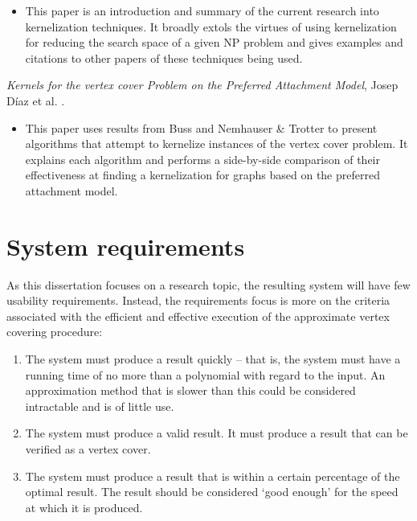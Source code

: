 \documentclass[11pt]{article}
\theoremstyle{definition}
\begin{document}
\begin{basedescript}{\desclabelstyle{\nextlinelabel}}
        \begin{itemize} 
          \renewcommand{\labelitemi}{--}
          \setlength{\itemsep}{1pt}
          \setlength{\parskip}{0pt}
          \setlength{\parsep}{0pt}
          \item This paper is an introduction and summary of the current research into kernelization techniques. It broadly extols the virtues of using kernelization for reducing the search space of a given NP problem and gives examples and citations to other papers of these techniques being used.    
        \end{itemize} 
        \item \textit{Kernels for the vertex cover Problem on the Preferred Attachment Model},  Josep Díaz et al. \cite{paper:KernelVertex}.
        \begin{itemize} 
          \renewcommand{\labelitemi}{--}
          \setlength{\itemsep}{1pt}
          \setlength{\parskip}{0pt}
          \setlength{\parsep}{0pt}
          \item This paper uses results from Buss \cite{buss:560} and Nemhauser \& Trotter \cite{springerlink:NT} to present algorithms that attempt to kernelize instances of the vertex cover problem. It explains each algorithm and performs a side-by-side comparison of their effectiveness at finding a kernelization for graphs based on the preferred attachment model.  
        \end{itemize}
      \end{basedescript}

      

  \section{System requirements}
    As this dissertation focuses on a research topic, the resulting system will have few usability requirements.
    Instead, the requirements focus is more on the criteria associated with the efficient and effective execution
    of the approximate vertex covering procedure:

    \begin{enumerate}
      \setlength{\itemsep}{1pt}
      \setlength{\parskip}{0pt}
      \setlength{\parsep}{0pt}
      \item The system must produce a result quickly -- that is, the system must have a running time of no more than a polynomial with regard to the input. An approximation method that is slower than this could be considered intractable and is of little use.  
      \item The system must produce a valid result. It must produce a result that can be verified as a vertex cover.
      \item The system must produce a result that is within a certain percentage of the optimal result. The result should be considered `good enough' for the speed at which it is produced.   
    \end{enumerate}
     
\end{document}
